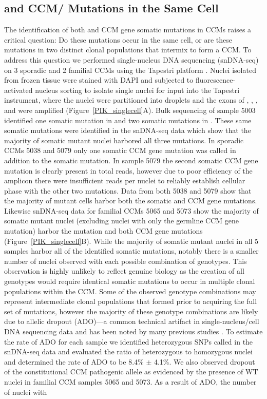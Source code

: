 \subsection{ and CCM/ Mutations in the Same Cell}
The identification of both  and CCM gene somatic mutations in CCMs raises a critical question: Do these mutations occur in the same cell, or are these mutations in two distinct clonal populations that intermix to form a CCM. To address this question we performed single-nucleus DNA sequencing (snDNA-seq) on 3 sporadic and 2 familial CCMs using the Tapestri platform \citep{xu2019}. Nuclei isolated from frozen tissue were stained with DAPI and subjected to fluorescence-activated nucleus sorting to isolate single nuclei for input into the Tapestri instrument, where the nuclei were partitioned into droplets and the exons of , , , and  were amplified (Figure~\ref{PIK_singlecell}A). Bulk sequencing of sample 5003 identified one somatic mutation in  and two somatic mutations in . These same somatic mutations were identified in the snDNA-seq data which show that the majority of somatic mutant nuclei harbored all three mutations. In sporadic CCMs 5038 and 5079 only one somatic CCM gene mutation was called in addition to the  somatic mutation. In sample 5079 the second somatic CCM gene mutation is clearly present in total reads, however due to poor efficiency of the amplicon there were insufficient reads per nuclei to reliably establish cellular phase with the other two mutations. Data from both 5038 and 5079 show that the majority of mutant cells harbor both the somatic  and CCM gene mutations. Likewise snDNA-seq data for familial CCMs 5065 and 5073 show the majority of somatic mutant nuclei (excluding nuclei with only the germline CCM gene mutation) harbor the  mutation and both CCM gene mutations (Figure~\ref{PIK_singlecell}B). While the majority of somatic mutant nuclei in all 5 samples harbor all of the identified somatic mutations, notably there is a smaller number of nuclei observed with each possible combination of genotypes. This observation is highly unlikely to reflect genuine biology as the creation of all genotypes would require identical somatic mutations to occur in multiple clonal populations within the CCM. Some of the observed genotype combinations may represent intermediate clonal populations that formed prior to acquiring the full set of mutations, however the majority of these genotype combinations are likely due to allelic dropout (ADO)---a common technical artifact in single-nucleus/cell DNA sequencing data and has been noted by many previous studies \citep{xu2019, szulwach2015, satas2018}. To estimate the rate of ADO for each sample we identified heterozygous SNPs called in the snDNA-seq data and evaluated the ratio of heterozygous to homozygous nuclei and determined the rate of ADO to be 8.4\% $\pm$ 4.1\%. We also observed dropout of the constitutional CCM pathogenic allele as evidenced by the presence of WT nuclei in familial CCM samples 5065 and 5073. As a result of ADO, the number of nuclei with 